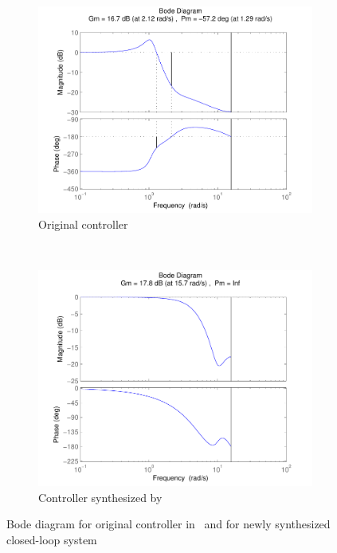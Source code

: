 \documentclass[final]{sig-alternate-05-2015}
\newcommand{\blue}[1]{{\color{blue}#1}}
\begin{document}
%
\begin{figure}[tb]
    \centering
    \begin{subfigure}[b]{0.45\textwidth}
        \includegraphics[width=\textwidth]{figures/runningexample_bd0.pdf}
        \caption{Original controller~\cite{DBLP:conf/hybrid/WangGRJF16}}
        \label{fig:original}
    \end{subfigure}
    ~
    \begin{subfigure}[b]{0.45\textwidth}
        \includegraphics[width=\textwidth]{figures/runningexample_bd2.pdf}
        \caption{Controller synthesized by \tool}
        \label{fig:cegiscontroller}
    \end{subfigure}
    \caption{Bode diagram for original controller in~\cite{DBLP:conf/hybrid/WangGRJF16} 
    and for newly synthesized closed-loop system}\label{fig:bode}
\end{figure}
\end{document}
